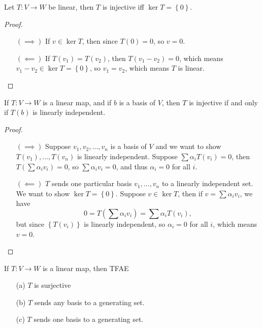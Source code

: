 \begin{proposition} \label{prop: injective means ker has only 0}
    Let \(T:V \to W\) be linear, then \(T\) is injective iff \(\ker T = \left\{ 0 \right\}\). 
\end{proposition}   
\begin{proof}
    \vphantom{text}
    \begin{itemize}
        \item [\((\implies )\)] If \(v \in \ker T\), then since \(T(0) = 0\), so \(v=0\).  
        \item [\((\impliedby) \)] If \(T(v_1) = T(v_2)\), then \(T(v_1 - v_2) = 0\), which means \(v_1 - v_2 \in \ker T = \left\{ 0 \right\} \), so \(v_1 = v_2\), which means \(T\) is linear.  
    \end{itemize}
\end{proof}

\begin{proposition}
    If \(T:V \to W\) is a linear map, and if \(b\) is a basis of \(V\), then \(T\) is injective if and only if \(T(b)\) is linearly independent.   
\end{proposition}
\begin{proof}
    \vphantom{text}
    \begin{itemize}
        \item [\((\implies )\)] Suppose \(v_1, v_2, \dots , v_n\) is a basis of \(V\) and we want to show \(T(v_1), \dots , T(v_n)\) is linearly independent. Suppose \(\sum \alpha _i T(v_i) = 0 \), then \(T \left( \sum \alpha _i v_i  \right) = 0 \), so \(\sum \alpha _i v_i = 0 \), and thus \(\alpha _i = 0\) for all \(i\).   
        \item [\((\impliedby )\)] \(T\) sends one particular basis \(v_1, \dots , v_n\)  to a linearly independent set. We want to show \(\ker T = \left\{ 0 \right\} \). Suppose \(v \in \ker T\), then if \(v = \sum \alpha _i v_i \), we have 
        \[
            0 = T \left( \sum \alpha _i v_i  \right) = \sum \alpha _i T (v_i),  
        \] but since \(\left\{ T(v_i) \right\} \) is linearly independent, so \(\alpha _i = 0\) for all \(i\), which means \(v = 0\).     
    \end{itemize}
\end{proof}

\begin{proposition}\label{prop: surjective TFAE}
    If \(T:V \to W\) is a linear map, then TFAE 
    \begin{itemize}
        \item [(a)] \(T\) is surjective 
        \item [(b)] \(T\) sends any basis to a generating set. 
        \item [(c)] \(T\) sends one basis to a generating set.    
    \end{itemize} 
\end{proposition}

